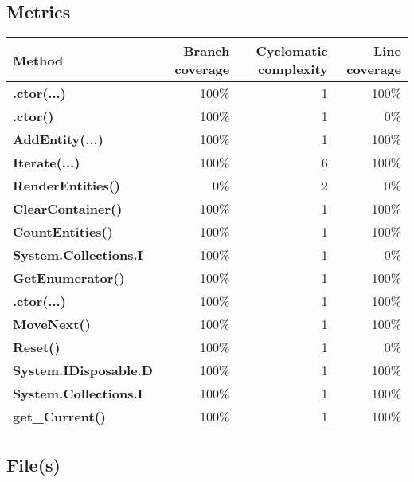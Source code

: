 \documentclass[a4paper,landscape,10pt]{article}
\begin{document}
\subsection{Metrics}
\begin{longtable}[l]{|l|r|r|r|}
\hline
\textbf{Method} & \textbf{Branch coverage} & \textbf{Cyclomatic complexity} & \textbf{Line coverage}\\
\hline
\textbf{.ctor(...)} & 100\% & 1 & 100\%\\
\hline
\textbf{.ctor()} & 100\% & 1 & 0\%\\
\hline
\textbf{AddEntity(...)} & 100\% & 1 & 100\%\\
\hline
\textbf{Iterate(...)} & 100\% & 6 & 100\%\\
\hline
\textbf{RenderEntities()} & 0\% & 2 & 0\%\\
\hline
\textbf{ClearContainer()} & 100\% & 1 & 100\%\\
\hline
\textbf{CountEntities()} & 100\% & 1 & 100\%\\
\hline
\textbf{System.Collections.I} & 100\% & 1 & 0\%\\
\hline
\textbf{GetEnumerator()} & 100\% & 1 & 100\%\\
\hline
\textbf{.ctor(...)} & 100\% & 1 & 100\%\\
\hline
\textbf{MoveNext()} & 100\% & 1 & 100\%\\
\hline
\textbf{Reset()} & 100\% & 1 & 0\%\\
\hline
\textbf{System.IDisposable.D} & 100\% & 1 & 100\%\\
\hline
\textbf{System.Collections.I} & 100\% & 1 & 100\%\\
\hline
\textbf{get\_Current()} & 100\% & 1 & 100\%\\
\hline
\end{longtable}
\subsection{File(s)}
\end{document}
